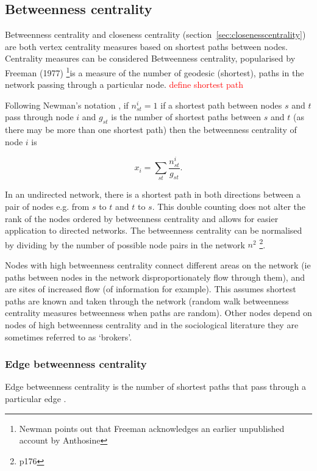 \subsection{Betweenness centrality }
\label{sec:Betweeness centrality}
Betweenness centrality and closeness centrality (section~\ref{sec:closenesscentrality})  are both vertex centrality measures based on shortest paths between nodes\cite{newman2018networks}. Centrality measures can be considered Betweenness centrality, popularised by Freeman (1977) \cite{freeman1977set}\footnote{Newman \cite{newman2018networks} points out that Freeman acknowledges an earlier unpublished account by Anthosine}is a measure of the number of geodesic (shortest), paths in the network passing through a particular node. \textcolor{red}{define shortest path} 

 Following Newman's notation \cite{newman2018networks}, if $n_{st}^i=1$  if a shortest path between nodes $s$ and $t$ pass through node $i$ and  $g_{st}$ is the number of shortest paths between $s$ and $t$ (as there may be more than one shortest path) then the betweenness centrality of node $i$ is

\begin{equation}
    x_i = \sum_{st} \frac{n_{st}^i}{g_{st}}.
\end{equation}
\label{eq: Betweenness centrality}

In an undirected network, there is a shortest path in both directions between a pair of nodes e.g. from $s$ to $t$ and $t$ to $s$. This double counting does not alter the rank of the nodes ordered by betweenness centrality and allows for easier application to directed networks\cite{newman2018networks}. The betweenness centrality can be normalised by dividing by the number of possible node pairs in the network $n^2$ \cite{newman2018networks} \footnote{p176}.

Nodes with high betweenness centrality connect different areas on the network  (ie paths between nodes in the network disproportionately flow through them), and are sites of increased flow (of information for example). This assumes shortest paths are known and taken through the network \cite{borgatti2005centrality}  (random walk betweenness centrality measures betweenness when paths are random). Other nodes depend on nodes of high betweenness centrality and in the sociological literature they are sometimes referred to as `brokers'\cite{newman2018networks}. 



\subsubsection{Edge betweenness centrality}
 Edge betweenness centrality is the number of shortest paths that pass through a particular edge \cite{girvan2002community}.

